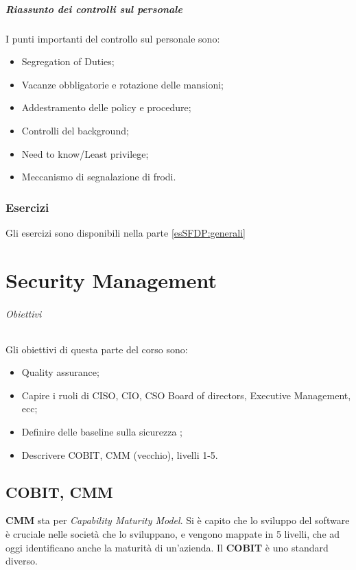 \subsubsection{Riassunto dei controlli sul personale}

I punti importanti del controllo sul personale sono:
\begin{itemize}
\item Segregation of Duties;
\item Vacanze obbligatorie e rotazione delle mansioni;
\item Addestramento delle policy e procedure;
\item Controlli del background;
\item Need to know/Least privilege;
\item Meccanismo di segnalazione di frodi.
\end{itemize}

\section{Esercizi}

Gli esercizi sono disponibili nella parte \ref{esSFDP:generali}

\part{Security Management}
\label{SM}

\paragraph{Obiettivi}

Gli obiettivi di questa parte del corso sono:
\begin{itemize}
\item Quality assurance;
\item Capire i ruoli di CISO, CIO, CSO Board of directors, Executive 
Management, ecc;
\item Definire delle baseline sulla sicurezza ;
\item Descrivere COBIT, CMM (vecchio), livelli 1-5.
\end{itemize}

\chapter{COBIT, CMM}

\textbf{CMM} sta per \textit{Capability Maturity Model}. Si è capito che lo 
sviluppo del software è cruciale nelle società che lo sviluppano, e vengono 
mappate in 5 livelli, che ad oggi identificano anche la maturità di un'azienda.
Il \textbf{COBIT} è uno standard diverso.

